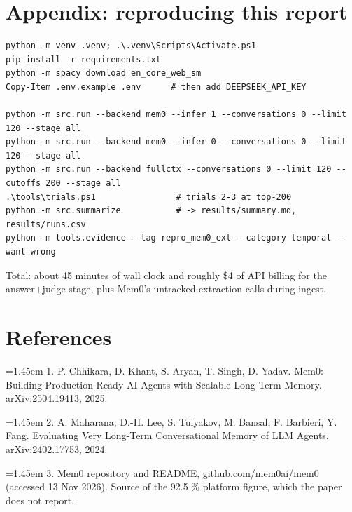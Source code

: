 \documentclass[11pt,a4paper]{article}
\begin{document}
\section*{Appendix: reproducing this report}

\begin{Verbatim}[fontsize=\footnotesize,frame=single,xleftmargin=4pt]
python -m venv .venv; .\.venv\Scripts\Activate.ps1
pip install -r requirements.txt
python -m spacy download en_core_web_sm
Copy-Item .env.example .env      # then add DEEPSEEK_API_KEY

python -m src.run --backend mem0 --infer 1 --conversations 0 --limit 120 --stage all
python -m src.run --backend mem0 --infer 0 --conversations 0 --limit 120 --stage all
python -m src.run --backend fullctx --conversations 0 --limit 120 --cutoffs 200 --stage all
.\tools\trials.ps1                # trials 2-3 at top-200
python -m src.summarize           # -> results/summary.md, results/runs.csv
python -m tools.evidence --tag repro_mem0_ext --category temporal --want wrong
\end{Verbatim}

Total: about 45 minutes of wall clock and roughly \$4 of API billing for the answer+judge stage, plus Mem0's untracked extraction calls during ingest.

\section*{References}

\noindent\hangindent=1.45em 1. P. Chhikara, D. Khant, S. Aryan, T. Singh, D. Yadav. Mem0: Building Production-Ready AI Agents with Scalable Long-Term Memory. arXiv:2504.19413, 2025.

\noindent\hangindent=1.45em 2. A. Maharana, D.-H. Lee, S. Tulyakov, M. Bansal, F. Barbieri, Y. Fang. Evaluating Very Long-Term Conversational Memory of LLM Agents. arXiv:2402.17753, 2024.

\noindent\hangindent=1.45em 3. Mem0 repository and README, github.com/mem0ai/mem0 (accessed 13 Nov 2026). Source of the 92.5 \% platform figure, which the paper does not report.
\end{document}
